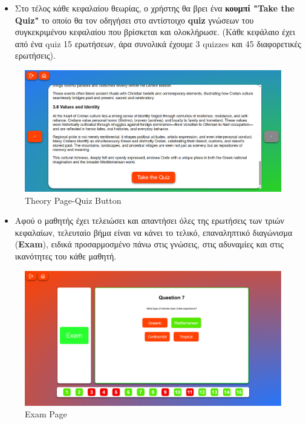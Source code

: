 \begin{itemize}
    \item Στο τέλος κάθε κεφαλαίου θεωρίας, ο χρήστης θα βρει ένα \textbf{κουμπί \textlatin{"Take the Quiz"}} το οποίο θα τον οδηγήσει στο αντίστοιχο \textlatin{\textbf{quiz}} γνώσεων του συγκεκριμένου κεφαλαίου που βρίσκεται και ολοκλήρωσε. (Κάθε κεφάλαιο έχει από ένα \textlatin{quiz} 15 ερωτήσεων, άρα συνολικά έχουμε 3 \textlatin{quizzes} και 45 διαφορετικές ερωτήσεις).
\end{itemize}
\begin{figure}[H]
    \centering
    \includegraphics[width=1\linewidth]{img/Theory-TestButton.png}
    \caption{\textlatin{Theory Page-Quiz Button}}
\end{figure}

\begin{itemize}
    \item Αφού ο μαθητής έχει τελειώσει και απαντήσει όλες της ερωτήσεις των τριών κεφαλαίων, τελευταίο βήμα είναι να κάνει το τελικό, επαναληπτικό διαγώνισμα (\textlatin{\textbf{Exam}}), ειδικά προσαρμοσμένο πάνω στις γνώσεις, στις αδυναμίες και στις ικανότητες του κάθε μαθητή.
\end{itemize}

\begin{figure}[H]
    \centering
    \includegraphics[width=1\linewidth]{img/ExamQuiz.png}
    \caption{\textlatin{Exam Page}}
\end{figure}

